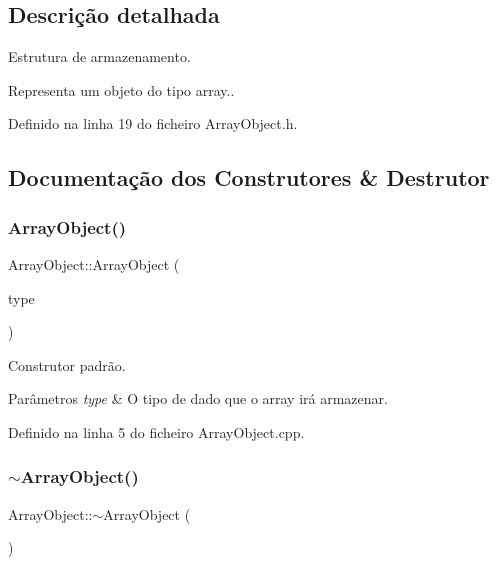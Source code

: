 \subsection{Descrição detalhada}
Estrutura de armazenamento. 

Representa um objeto do tipo array.. 

Definido na linha 19 do ficheiro Array\+Object.\+h.



\subsection{Documentação dos Construtores \& Destrutor}
\mbox{\label{classArrayObject_afd91a9df894ad32f51e40da74de7f2c4}} 
\subsubsection{\texorpdfstring{Array\+Object()}{ArrayObject()}}
{\footnotesize\ttfamily Array\+Object\+::\+Array\+Object (\begin{DoxyParamCaption}\item[{\hyperlink{BasicTypes_8h_ad9971b6ef33e02ba2c75d19c1d2518a1}{Value\+Type}}]{type }\end{DoxyParamCaption})}



Construtor padrão. 


\begin{DoxyParams}{Parâmetros}
{\em type} & O tipo de dado que o array irá armazenar. \\
\hline
\end{DoxyParams}


Definido na linha 5 do ficheiro Array\+Object.\+cpp.

\mbox{\label{classArrayObject_a91c9426247002224d484c32883ff51b1}} 
\subsubsection{\texorpdfstring{$\sim$\+Array\+Object()}{~ArrayObject()}}
{\footnotesize\ttfamily Array\+Object\+::$\sim$\+Array\+Object (\begin{DoxyParamCaption}{ }\end{DoxyParamCaption})}



